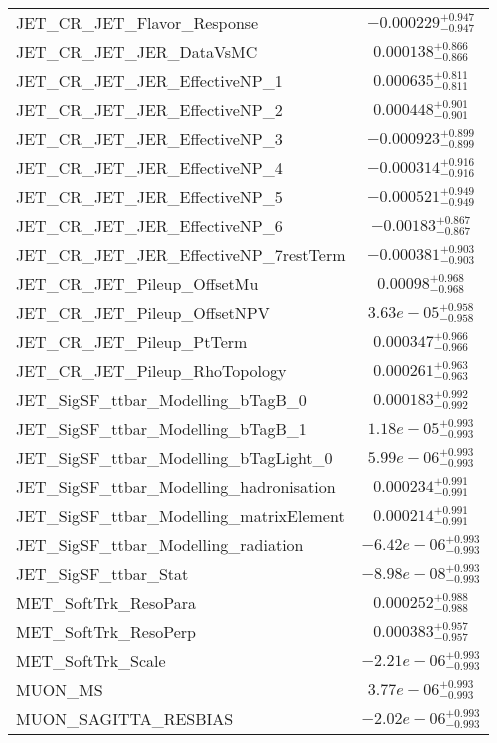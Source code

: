 \begin{tabular}{|l|c|}
JET\_CR\_JET\_Flavor\_Response & $-0.000229^{+0.947}_{-0.947}$ \\
JET\_CR\_JET\_JER\_DataVsMC & $0.000138^{+0.866}_{-0.866}$ \\
JET\_CR\_JET\_JER\_EffectiveNP\_1 & $0.000635^{+0.811}_{-0.811}$ \\
JET\_CR\_JET\_JER\_EffectiveNP\_2 & $0.000448^{+0.901}_{-0.901}$ \\
JET\_CR\_JET\_JER\_EffectiveNP\_3 & $-0.000923^{+0.899}_{-0.899}$ \\
JET\_CR\_JET\_JER\_EffectiveNP\_4 & $-0.000314^{+0.916}_{-0.916}$ \\
JET\_CR\_JET\_JER\_EffectiveNP\_5 & $-0.000521^{+0.949}_{-0.949}$ \\
JET\_CR\_JET\_JER\_EffectiveNP\_6 & $-0.00183^{+0.867}_{-0.867}$ \\
JET\_CR\_JET\_JER\_EffectiveNP\_7restTerm & $-0.000381^{+0.903}_{-0.903}$ \\
JET\_CR\_JET\_Pileup\_OffsetMu & $0.00098^{+0.968}_{-0.968}$ \\
JET\_CR\_JET\_Pileup\_OffsetNPV & $3.63e-05^{+0.958}_{-0.958}$ \\
JET\_CR\_JET\_Pileup\_PtTerm & $0.000347^{+0.966}_{-0.966}$ \\
JET\_CR\_JET\_Pileup\_RhoTopology & $0.000261^{+0.963}_{-0.963}$ \\
JET\_SigSF\_ttbar\_Modelling\_bTagB\_0 & $0.000183^{+0.992}_{-0.992}$ \\
JET\_SigSF\_ttbar\_Modelling\_bTagB\_1 & $1.18e-05^{+0.993}_{-0.993}$ \\
JET\_SigSF\_ttbar\_Modelling\_bTagLight\_0 & $5.99e-06^{+0.993}_{-0.993}$ \\
JET\_SigSF\_ttbar\_Modelling\_hadronisation & $0.000234^{+0.991}_{-0.991}$ \\
JET\_SigSF\_ttbar\_Modelling\_matrixElement & $0.000214^{+0.991}_{-0.991}$ \\
JET\_SigSF\_ttbar\_Modelling\_radiation & $-6.42e-06^{+0.993}_{-0.993}$ \\
JET\_SigSF\_ttbar\_Stat & $-8.98e-08^{+0.993}_{-0.993}$ \\
MET\_SoftTrk\_ResoPara & $0.000252^{+0.988}_{-0.988}$ \\
MET\_SoftTrk\_ResoPerp & $0.000383^{+0.957}_{-0.957}$ \\
MET\_SoftTrk\_Scale & $-2.21e-06^{+0.993}_{-0.993}$ \\
MUON\_MS & $3.77e-06^{+0.993}_{-0.993}$ \\
MUON\_SAGITTA\_RESBIAS & $-2.02e-06^{+0.993}_{-0.993}$ \\

\end{tabular}
